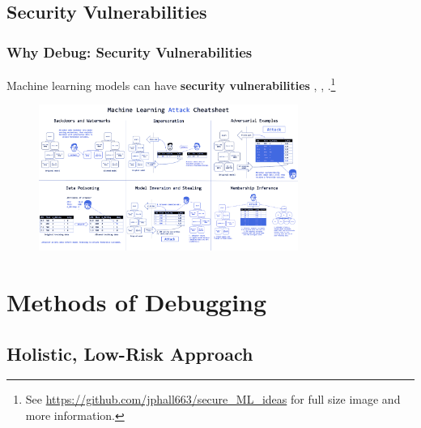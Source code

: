 \documentclass[11pt,
               aspectratio=169,
               hyperref={colorlinks}
               ]{beamer}
\begin{document}
		\subsection{Security Vulnerabilities}
			\begin{frame}[t]
		
				\frametitle{Why Debug: Security Vulnerabilities}
		
				\footnotesize{Machine learning models can have \textbf{security vulnerabilities} \cite{security_of_ml}, \cite{membership_inference}, \cite{model_stealing}}.\footnote{\tiny{See \url{https://github.com/jphall663/secure_ML_ideas} for full size image and more information.}}
				\begin{figure}[]
					\begin{center}
						\includegraphics[height=135pt]{../img/cheatsheet_blue.png}
					\end{center}
				\end{figure}	
				\vspace{-17pt}
				\normalsize
		
			\end{frame}

	\section{Methods of Debugging}

		\subsection{Holistic, Low-Risk Approach}
	
\end{document}
